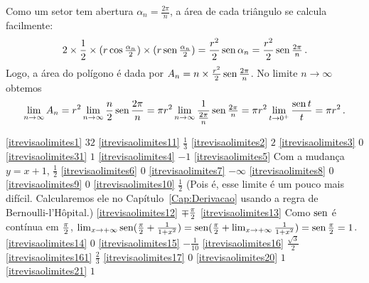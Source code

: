 \begin{Solution}{4.32}
\mbox{}
\begin{center}
\begin{bmlimage}\end{bmlimage}
\end{center}
Como um setor tem abertura $\alpha_n=\frac{2\pi}{n}$,
a área de cada triângulo se calcula facilmente:
$$2\times \frac12
\times(r\cos\tfrac{\alpha_n}{2})\times
(r\operatorname{sen}\tfrac{\alpha_n}{2})=\frac{r^2}{2}\operatorname{sen}
{\alpha_n}=\frac{r^2}{2}\operatorname{sen} \tfrac{2\pi}{n}\,.$$
Logo, a área do polígono é dada por $A_n=n\times \frac{r^2}{2}\operatorname{sen}
\frac{2\pi}{n}$. No limite $n\to \infty$ obtemos
$$
\lim_{n\to \infty}A_n=r^2\lim_{n\to \infty}\frac{n}{2}\operatorname{sen} \frac{2\pi}{n}
=\pi r^2\lim_{n\to \infty}\frac{1}{\frac{2\pi}{n}}\operatorname{sen} \tfrac{2\pi}{n}
=\pi r^2\lim_{t\to 0^+}\frac{\operatorname{sen} t}{t}=\pi r^2\,.
$$
\end{Solution}
\begin{Solution}{4.33}
\eqref{itrevisaolimites1} $32$
\eqref{itrevisaolimites11} $\frac13$
\eqref{itrevisaolimites2} $2$
\eqref{itrevisaolimites3} $0$
\eqref{itrevisaolimites31} $1$
\eqref{itrevisaolimites4} $-1$
\eqref{itrevisaolimites5} Com a mudança $y=x+1$, $\frac12$
\eqref{itrevisaolimites6} $0$
\eqref{itrevisaolimites7} $-\infty$
\eqref{itrevisaolimites8} $0$
\eqref{itrevisaolimites9} $0$
\eqref{itrevisaolimites10} $\tfrac12$ (Pois é, esse limite é
um pouco mais difícil. Calcularemos ele no
Capítulo~\ref{Cap:Derivacao} usando a regra de
Bernoulli-l'Hôpital.)
\eqref{itrevisaolimites12} $\mp \tfrac{\pi}{2}$
\eqref{itrevisaolimites13} Como $\operatorname{sen}$ é contínua em $\tfrac{\pi}{2}$,
$\lim_{{x}\to {+\infty}}\operatorname{sen}(\frac{\pi}{2}+\frac{1}{1+x^2})=\operatorname{sen}(\frac{
\pi}{2}+\lim_{{x}\to {+\infty}}\frac{1}{1+x^2})=\operatorname{sen} \tfrac{\pi}{2} =1$.
\eqref{itrevisaolimites14} $0$
\eqref{itrevisaolimites15} $-\frac{1}{10}$
\eqref{itrevisaolimites16} $\frac{\sqrt{3}}{2}$
\eqref{itrevisaolimites161} $\frac{2}{3}$
\eqref{itrevisaolimites17} $0$
\eqref{itrevisaolimites20} $1$
\eqref{itrevisaolimites21} $1$
\end{Solution}
